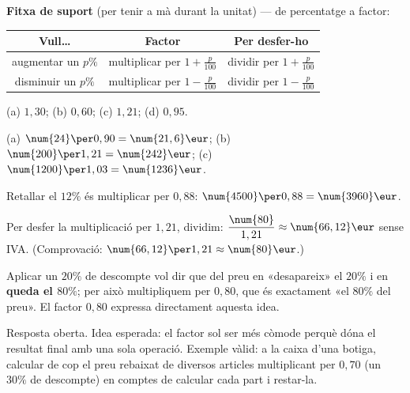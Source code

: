 \begin{idea}
\textbf{Fitxa de suport} (per tenir a mà durant la unitat) — de percentatge a factor:
\begin{center}
\renewcommand{\arraystretch}{1.3}
\begin{tabular}{c c c}
\toprule
\textbf{Vull\dots} & \textbf{Factor} & \textbf{Per desfer-ho} \\
\midrule
augmentar un $p\%$ & multiplicar per $1+\frac{p}{100}$ & dividir per $1+\frac{p}{100}$ \\
disminuir un $p\%$ & multiplicar per $1-\frac{p}{100}$ & dividir per $1-\frac{p}{100}$ \\
\bottomrule
\end{tabular}
\end{center}
\end{idea}

\begin{solucions}
\begin{sollist}
  \item (a) $1,30$; \quad (b) $0,60$; \quad (c) $1,21$; \quad (d) $0,95$.
  \item (a) $\num{24}\per 0,90=\num{21,6}\eur$; \quad
        (b) $\num{200}\per 1,21=\num{242}\eur$; \quad
        (c) $\num{1200}\per 1,03=\num{1236}\eur$.
  \item Retallar el $12\%$ és multiplicar per $0,88$:
        $\num{4500}\per 0,88=\num{3960}\eur$.
  \item Per desfer la multiplicació per $1,21$, dividim:
        $\dfrac{\num{80}}{1,21}\approx \num{66,12}\eur$ sense IVA. (Comprovació:
        $\num{66,12}\per 1,21\approx \num{80}\eur$.)
  \item Aplicar un $20\%$ de descompte vol dir que del preu en «desapareix» el $20\%$ i
        en \textbf{queda el $80\%$}; per això multipliquem per $0,80$, que és
        exactament «el $80\%$ del preu». El factor $0,80$ expressa directament aquesta
        idea.
  \item Resposta oberta. Idea esperada: el factor sol ser més còmode perquè dóna el
        resultat final amb una sola operació. Exemple vàlid: a la caixa d'una botiga,
        calcular de cop el preu rebaixat de diversos articles multiplicant per $0,70$
        (un $30\%$ de descompte) en comptes de calcular cada part i restar-la.
\end{sollist}
\end{solucions}
